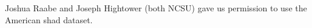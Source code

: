 Joshua Raabe and Joseph Hightower (both NCSU) gave us permission to use the American shad dataset. 

